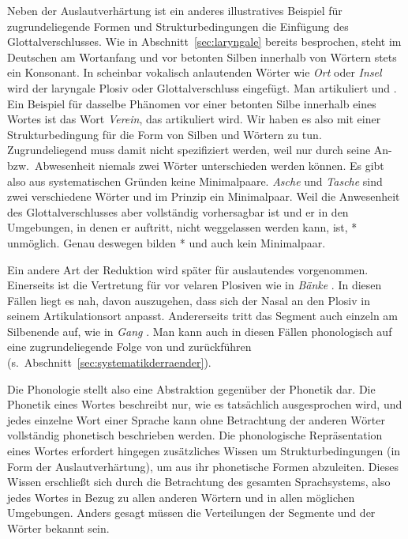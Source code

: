 Neben der Auslautverhärtung ist ein anderes illustratives Beispiel für zugrundeliegende Formen und Strukturbedingungen die Einfügung des Glottalverschlusses.
Wie in Abschnitt~\ref{sec:laryngale} bereits besprochen, steht im Deutschen am Wortanfang und vor betonten Silben innerhalb von Wörtern stets ein Konsonant.
In scheinbar vokalisch anlautenden Wörter wie \textit{Ort} oder \textit{Insel} wird der laryngale Plosiv oder Glottalverschluss \textipa{[P]} eingefügt.
Man artikuliert \textipa{[P\t{O@}t]} und \textipa{[PInz@l]}.
Ein Beispiel für dasselbe Phänomen vor einer betonten Silbe innerhalb eines Wortes ist das Wort \textit{Verein}, das \textipa{[f5P\t{aE}n]} artikuliert wird.
Wir haben es also mit einer Strukturbedingung für die Form von Silben und Wörtern zu tun.
Zugrundeliegend muss \textipa{[P]} damit nicht spezifiziert werden, weil nur durch seine An- bzw.\ Abwesenheit niemals zwei Wörter unterschieden werden können.
Es gibt also aus systematischen Gründen keine Minimalpaare.
\textit{Asche} \textipa{[PaS@]} und \textit{Tasche} \textipa{[taS@]} sind zwei verschiedene Wörter und im Prinzip ein Minimalpaar.
Weil die Anwesenheit des Glottalverschlusses aber vollständig vorhersagbar ist und er in den Umgebungen, in denen er auftritt, nicht weggelassen werden kann, ist, *\textipa{[aS@]} unmöglich.
Genau deswegen bilden *\textipa{[aS@]} und \textipa{[PaS@]} auch kein Minimalpaar.

Ein andere Art der Reduktion wird später für auslautendes \textipa{[N]} vorgenommen.
Einerseits ist \textipa{[N]} die Vertretung für \textipa{[n]} vor velaren Plosiven wie in \textit{Bänke} \textipa{[bENk@]}.
In diesen Fällen liegt es nah, davon auszugehen, dass sich der Nasal an den Plosiv in seinem Artikulationsort anpasst.
Andererseits tritt das Segment auch einzeln am Silbenende auf, wie in \textit{Gang} \textipa{[gaN]}.
Man kann \textipa{[N]} auch in diesen Fällen phonologisch auf eine zugrundeliegende Folge von \textipa{[n]} und \textipa{[g]} zurückführen (s.\ Abschnitt~\ref{sec:systematikderraender}).

Die Phonologie stellt also eine Abstraktion gegenüber der Phonetik dar.
Die Phonetik eines Wortes beschreibt nur, wie es tatsächlich ausgesprochen wird, und jedes einzelne Wort einer Sprache kann ohne Betrachtung der anderen Wörter vollständig phonetisch beschrieben werden.
Die phonologische Repräsentation eines Wortes erfordert hingegen zusätzliches Wissen um Strukturbedingungen (\zB in Form der Auslautverhärtung), um aus ihr phonetische Formen abzuleiten.
Dieses Wissen erschließt sich durch die Betrachtung des gesamten Sprachsystems, also jedes Wortes in Bezug zu allen anderen Wörtern und in allen möglichen Umgebungen.
Anders gesagt müssen die Verteilungen der Segmente und der Wörter bekannt sein.


